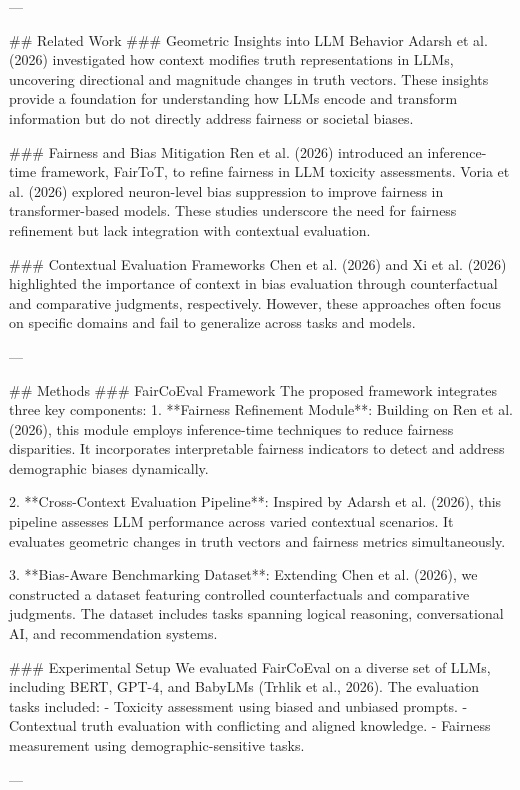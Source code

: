 ---

## Related Work
### Geometric Insights into LLM Behavior
Adarsh et al. (2026) investigated how context modifies truth representations in LLMs, uncovering directional and magnitude changes in truth vectors. These insights provide a foundation for understanding how LLMs encode and transform information but do not directly address fairness or societal biases.

### Fairness and Bias Mitigation
Ren et al. (2026) introduced an inference-time framework, FairToT, to refine fairness in LLM toxicity assessments. Voria et al. (2026) explored neuron-level bias suppression to improve fairness in transformer-based models. These studies underscore the need for fairness refinement but lack integration with contextual evaluation.

### Contextual Evaluation Frameworks
Chen et al. (2026) and Xi et al. (2026) highlighted the importance of context in bias evaluation through counterfactual and comparative judgments, respectively. However, these approaches often focus on specific domains and fail to generalize across tasks and models.

---

## Methods
### FairCoEval Framework
The proposed framework integrates three key components:
1. **Fairness Refinement Module**: Building on Ren et al. (2026), this module employs inference-time techniques to reduce fairness disparities. It incorporates interpretable fairness indicators to detect and address demographic biases dynamically.
   
2. **Cross-Context Evaluation Pipeline**: Inspired by Adarsh et al. (2026), this pipeline assesses LLM performance across varied contextual scenarios. It evaluates geometric changes in truth vectors and fairness metrics simultaneously.

3. **Bias-Aware Benchmarking Dataset**: Extending Chen et al. (2026), we constructed a dataset featuring controlled counterfactuals and comparative judgments. The dataset includes tasks spanning logical reasoning, conversational AI, and recommendation systems.

### Experimental Setup
We evaluated FairCoEval on a diverse set of LLMs, including BERT, GPT-4, and BabyLMs (Trhlik et al., 2026). The evaluation tasks included:
- Toxicity assessment using biased and unbiased prompts.
- Contextual truth evaluation with conflicting and aligned knowledge.
- Fairness measurement using demographic-sensitive tasks.

---

